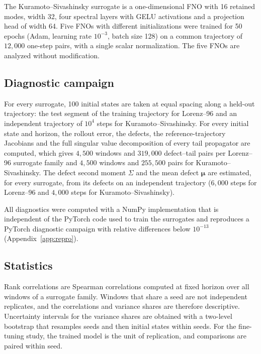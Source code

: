 The Kuramoto--Sivashinsky surrogate is a one-dimensional FNO \citep{li2021} with 16 retained modes, width 32, four spectral layers with GELU activations and a projection head of width 64. Five FNOs with different initializations were trained for 50 epochs (Adam, learning rate $10^{-3}$, batch size 128) on a common trajectory of $12{,}000$ one-step pairs, with a single scalar normalization. The five FNOs are analyzed without modification.

\subsection{Diagnostic campaign}

For every surrogate, 100 initial states are taken at equal spacing along a held-out trajectory: the test segment of the training trajectory for Lorenz--96 and an independent trajectory of $10^4$ steps for Kuramoto--Sivashinsky. For every initial state and horizon, the rollout error, the defects, the reference-trajectory Jacobians and the full singular value decomposition of every tail propagator are computed, which gives $4{,}500$ windows and $319{,}000$ defect--tail pairs per Lorenz--96 surrogate family and $4{,}500$ windows and $255{,}500$ pairs for Kuramoto--Sivashinsky. The defect second moment $\Sigma$ and the mean defect $\boldsymbol\mu$ are estimated, for every surrogate, from its defects on an independent trajectory ($6{,}000$ steps for Lorenz--96 and $4{,}000$ steps for Kuramoto--Sivashinsky).

All diagnostics were computed with a NumPy implementation that is independent of the PyTorch code used to train the surrogates and reproduces a PyTorch diagnostic campaign with relative differences below $10^{-13}$ (Appendix~\ref{app:repro}).

\subsection{Statistics}

Rank correlations are Spearman correlations computed at fixed horizon over all windows of a surrogate family. Windows that share a seed are not independent replicates, and the correlations and variance shares are therefore descriptive. Uncertainty intervals for the variance shares are obtained with a two-level bootstrap that resamples seeds and then initial states within seeds. For the fine-tuning study, the trained model is the unit of replication, and comparisons are paired within seed.

